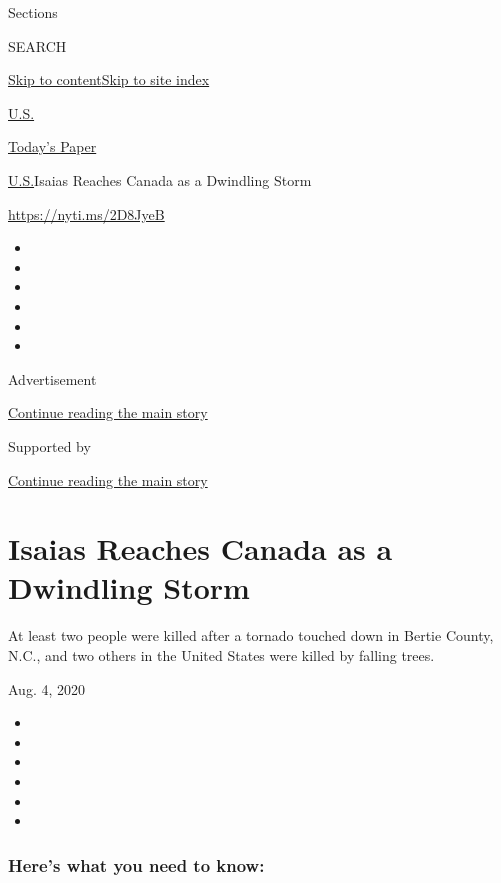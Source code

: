 Sections

SEARCH

\protect\hyperlink{site-content}{Skip to
content}\protect\hyperlink{site-index}{Skip to site index}

\href{https://www.nytimes3xbfgragh.onion/section/us}{U.S.}

\href{https://myaccount.nytimes3xbfgragh.onion/auth/login?response_type=cookie\&client_id=vi}{}

\href{https://www.nytimes3xbfgragh.onion/section/todayspaper}{Today's
Paper}

\href{/section/us}{U.S.}\textbar{}Isaias Reaches Canada as a Dwindling
Storm

\url{https://nyti.ms/2D8JyeB}

\begin{itemize}
\item
\item
\item
\item
\item
\item
\end{itemize}

Advertisement

\protect\hyperlink{after-top}{Continue reading the main story}

Supported by

\protect\hyperlink{after-sponsor}{Continue reading the main story}

\hypertarget{isaias-reaches-canada-as-a-dwindling-storm}{%
\section{Isaias Reaches Canada as a Dwindling
Storm}\label{isaias-reaches-canada-as-a-dwindling-storm}}

At least two people were killed after a tornado touched down in Bertie
County, N.C., and two others in the United States were killed by falling
trees.

Aug. 4, 2020

\begin{itemize}
\item
\item
\item
\item
\item
\item
\end{itemize}

\hypertarget{heres-what-you-need-to-know}{%
\subsubsection{Here's what you need to
know:}\label{heres-what-you-need-to-know}}


